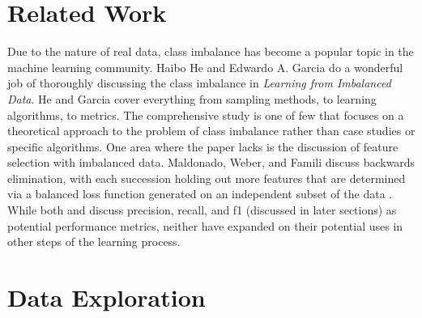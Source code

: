 \documentclass{sig-alternate-05-2015}
\begin{document}
\section{Related Work}
Due to the nature of real data, class imbalance has become a popular topic in the machine learning community. Haibo He and Edwardo A. Garcia do a wonderful job of thoroughly discussing the class imbalance in \textit{Learning from Imbalanced Data}. He and Garcia cover everything from sampling methods, to learning algorithms, to metrics. The comprehensive study is one of few that focuses on a theoretical approach to the problem of class imbalance rather than case studies or specific algorithms. One area where the paper lacks is the discussion of feature selection with imbalanced data.  Maldonado, Weber, and Famili discuss backwards elimination, with each succession holding out more features that are determined via a balanced loss function generated on an independent subset of the data \cite{featureSelection}. While both \cite{imbalanced} and \cite{featureSelection} discuss precision, recall, and f1 (discussed in later sections) as potential performance metrics, neither have expanded on their potential uses in other steps of the learning process.

\section{Data Exploration} \label{dataExploration}
\end{document}
